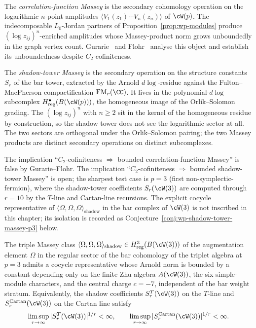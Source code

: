 \begin{enumerate}
The \emph{correlation-function Massey} is the secondary
cohomology operation on the logarithmic $n$-point amplitudes
$\langle V_1(z_1) \cdots V_n(z_n) \rangle$ of $\cW(p)$. The
indecomposable $L_0$-Jordan partners of
Proposition~\ref{prop:wp-modules} produce
$(\log z_{ij})^n$-enriched amplitudes whose Massey-product
norm grows unboundedly in the graph vertex count.
Gurarie~\cite{Gurarie1993} and Flohr~\cite{Flohr1996}
analyse this object and establish its unboundedness despite
$C_2$-cofiniteness.

The \emph{shadow-tower Massey} is the secondary operation on
the structure constants $S_r$ of the bar tower, extracted by
the Arnold $d\!\log$-residue against the Fulton--MacPherson
compactification $\mathrm{FM}_r(\CC)$. It lives in the
polynomial-$d\!\log$ subcomplex
$H^\bullet_{\mathrm{reg}}(B(\cW(p)))$, the homogeneous image
of the Orlik--Solomon grading. The $(\log z_{ij})^n$ with
$n \geq 2$ sit in the kernel of the homogeneous residue by
construction, so the shadow tower does not see the
logarithmic sector at all. The two sectors are orthogonal
under the Orlik--Solomon pairing; the two Massey products
are distinct secondary operations on distinct subcomplexes.

The implication
``$C_2$-cofiniteness $\Rightarrow$ bounded correlation-function
Massey'' is false by Gurarie--Flohr. The implication
``$C_2$-cofiniteness $\Rightarrow$ bounded shadow-tower
Massey'' is open; the sharpest test case is $p = 3$ (first
non-symplectic-fermion), where the shadow-tower coefficients
$S_r(\cW(3))$ are computed through $r = 10$ by the $T$-line
and Cartan-line recursions. The explicit cocycle representative
of $\langle \Omega, \Omega, \Omega \rangle_{\mathrm{shadow}}$
in the bar complex of $\cW(3)$ is not inscribed in this
chapter; its isolation is recorded as
Conjecture~\ref{conj:wp-shadow-tower-massey-p3} below.
\end{enumerate}

\begin{conjecture}\label{conj:wp-shadow-tower-massey-p3}
The triple Massey class
$\langle \Omega, \Omega, \Omega \rangle_{\mathrm{shadow}}
\in H^3_{\mathrm{reg}}(B(\cW(3)))$
of the augmentation element $\Omega$ in the regular sector of
the bar cohomology of the triplet algebra at $p = 3$ admits a
cocycle representative whose Arnold norm is bounded by a
constant depending only on the finite Zhu algebra
$A(\cW(3))$, the six simple-module characters, and the central
charge $c = -7$,
independent of the bar weight stratum. Equivalently, the
shadow coefficients $S_r^T(\cW(3))$ on the $T$-line and
$S_r^{\mathrm{Cartan}}(\cW(3))$ on the Cartan line satisfy
\[
\limsup_{r \to \infty}
|S_r^T(\cW(3))|^{1/r} < \infty,
\qquad
\limsup_{r \to \infty}
|S_r^{\mathrm{Cartan}}(\cW(3))|^{1/r} < \infty.
\]
\end{conjecture}

